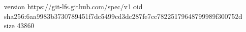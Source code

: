 version https://git-lfs.github.com/spec/v1
oid sha256:6aa9983b3730789451f7dc5499cd3dc287fe7cc78225179648799989f300752d
size 43860
